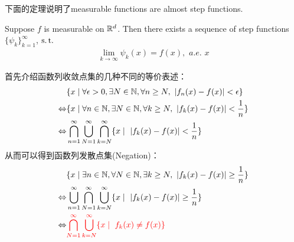 	\vspace{2em}
	下面的定理说明了measurable functions are almost step functions.
	\begin{thm}\label{thm 2.2.2}
		Suppose $f$ is measurable on $\mathbb{R}^d$. Then there exists a sequence of step functions $\{ \psi_k \}_{k = 1}^{\infty}$, $\operatorname{s.t.}$
		\begin{align}
			\lim_{k \to \infty}{\psi_{k}(x)} = f(x) , \,\, a.e. \,\, x
		\end{align}
	
		\begin{rmk}
			首先介绍函数列收敛点集的几种不同的等价表述：
			\begin{align}
				&\{ x \mid \forall \epsilon > 0 , \exists N \in \mathbb{N} , \forall n \geq N , \,\, \left| f_{n}(x) - f(x) \right| < \epsilon \} \\
				\Leftrightarrow 
				&\{ x \mid \forall n \in \mathbb{N} , \exists N \in \mathbb{N} , \forall k \geq N , \,\, \left| f_{k}(x) - f(x) \right| < \frac{1}{n} \} \\
				\Leftrightarrow 
				&\bigcap_{n = 1}^{\infty} \bigcup_{N = 1}^{\infty} \bigcap_{k = N}^{\infty} \{ x \mid \,\, \left| f_{k}(x) - f(x) \right| < \frac{1}{n} \}
			\end{align}
			从而可以得到函数列发散点集(Negation)：
			\begin{align}
				&\{ x \mid \exists n \in \mathbb{N} , \forall N \in \mathbb{N} , \exists k \geq N , \,\, \left| f_{k}(x) - f(x) \right| \geq \frac{1}{n} \} \\
				\Leftrightarrow 
				&\bigcup_{n = 1}^{\infty} \bigcap_{N = 1}^{\infty} \bigcup_{k = N}^{\infty} \{ x \mid \,\, \left| f_{k}(x) - f(x) \right| \geq \frac{1}{n} \} \\
				\Leftrightarrow
				&\textcolor{red}{\bigcap_{N = 1}^{\infty} \bigcup_{k = N}^{\infty} \{ x \mid \,\, f_{k}(x) \neq f(x) \}}
			\end{align}
		\end{rmk}
	

\end{thm}
